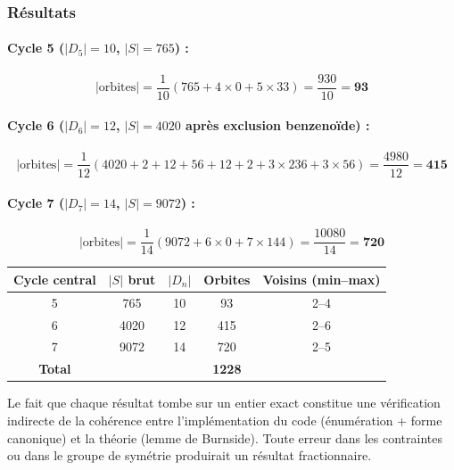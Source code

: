 \documentclass[a4paper,12pt]{article}
\begin{document}
\subsubsection{Résultats}

\paragraph{Cycle 5 ($|D_5| = 10$, $|S| = 765$) :}
\[
  |\text{orbites}| = \frac{1}{10}\left(765 + 4 \times 0 + 5 \times 33\right)
                   = \frac{930}{10} = \mathbf{93}
\]

\paragraph{Cycle 6 ($|D_6| = 12$, $|S| = 4020$ après exclusion benzenoïde) :}
\[
  |\text{orbites}| = \frac{1}{12}\left(
    4020 + 2 + 12 + 56 + 12 + 2 + 3 \times 236 + 3 \times 56
  \right)
  = \frac{4980}{12} = \mathbf{415}
\]

\paragraph{Cycle 7 ($|D_7| = 14$, $|S| = 9072$) :}
\[
  |\text{orbites}| = \frac{1}{14}\left(9072 + 6 \times 0 + 7 \times 144\right)
                   = \frac{10080}{14} = \mathbf{720}
\]

\begin{center}
\begin{tabular}{ccccc}
  \toprule
  Cycle central & $|S|$ brut & $|D_n|$ & Orbites & Voisins (min--max) \\
  \midrule
  5 &  765 & 10 &  93 & 2--4 \\
  6 & 4020 & 12 & 415 & 2--6 \\
  7 & 9072 & 14 & 720 & 2--5 \\
  \midrule
  \textbf{Total} & & & \textbf{1228} & \\
  \bottomrule
\end{tabular}
\end{center}

\begin{remarque}
  Le fait que chaque résultat tombe sur un entier exact constitue une vérification indirecte
  de la cohérence entre l'implémentation du code (énumération + forme canonique) et la théorie
  (lemme de Burnside). Toute erreur dans les contraintes ou dans le groupe de symétrie
  produirait un résultat fractionnaire.
\end{remarque}
\end{document}
